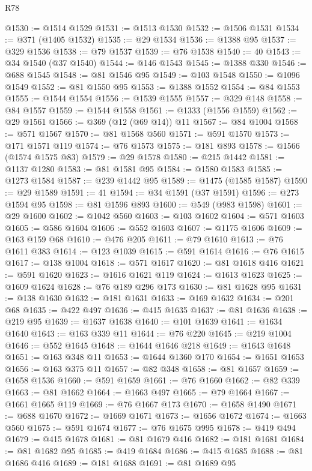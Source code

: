 \begin{lexlean}{R78}
\begin{coremodule}
@1530 := @1514 @1529
@1531 := @1513 @1530
@1532 := @1506 @1531
@1534 := @371 (@1405 @1532)
@1535 := @29 @1534
@1536 := @1388 @95
@1537 := @329 @1536
@1538 := @79 @1537
@1539 := @76 @1538
@1540 := 40
@1543 := @34 @1540 (@37 @1540)
@1544 := @146 @1543
@1545 := @1388 @330
@1546 := @688 @1545
@1548 := @81 @1546 @95
@1549 := @103 @1548
@1550 := @1096 @1549
@1552 := @81 @1550 @95
@1553 := @1388 @1552
@1554 := @84 @1553
@1555 := @1544 @1554
@1556 := @1539 @1555
@1557 := @329 @148
@1558 := @84 @1557
@1559 := @1544 @1558
@1561 := @1333 (@1556 @1559)
@1562 := @29 @1561
@1566 := @369 (@12 (@69 @14)) @11
@1567 := @84 @1004
@1568 := @571 @1567
@1570 := @81 @1568 @560
@1571 := @591 @1570
@1573 := @171 @1571 @119
@1574 := @76 @1573
@1575 := @181 @893
@1578 := @1566 (@1574 @1575 @83)
@1579 := @29 @1578
@1580 := @215 @1442
@1581 := @1137 @1280
@1583 := @81 @1581 @95
@1584 := @1580 @1583
@1585 := @1273 @1584
@1587 := @239 @1442 @95
@1589 := @1475 (@1585 @1587)
@1590 := @29 @1589
@1591 := 41
@1594 := @34 @1591 (@37 @1591)
@1596 := @273 @1594 @95
@1598 := @81 @1596 @893
@1600 := @549 (@983 @1598)
@1601 := @29 @1600
@1602 := @1042 @560
@1603 := @103 @1602
@1604 := @571 @1603
@1605 := @586 @1604
@1606 := @552 @1603
@1607 := @1175 @1606
@1609 := @163 @159 @68
@1610 := @476 @205
@1611 := @79 @1610
@1613 := @76 @1611 @383
@1614 := @123 @1039
@1615 := @591 @1614
@1616 := @76 @1615
@1617 := @138 @1004
@1618 := @571 @1617
@1620 := @81 @1618 @416
@1621 := @591 @1620
@1623 := @1616 @1621 @119
@1624 := @1613 @1623
@1625 := @1609 @1624
@1628 := @76 @189 @296 @173
@1630 := @81 @1628 @95
@1631 := @138 @1630
@1632 := @181 @1631
@1633 := @169 @1632
@1634 := @201 @68
@1635 := @422 @497
@1636 := @415 @1635
@1637 := @81 @1636
@1638 := @219 @95
@1639 := @1637 @1638
@1640 := @101 @1639
@1641 := @1634 @1640
@1643 := @163 @339 @11
@1644 := @76 @220
@1645 := @219 @1004
@1646 := @552 @1645
@1648 := @1644 @1646 @218
@1649 := @1643 @1648
@1651 := @163 @348 @11
@1653 := @1644 @1360 @170
@1654 := @1651 @1653
@1656 := @163 @375 @11
@1657 := @82 @348
@1658 := @81 @1657
@1659 := @1658 @1536
@1660 := @591 @1659
@1661 := @76 @1660
@1662 := @82 @339
@1663 := @81 @1662
@1664 := @1663 @497
@1665 := @79 @1664
@1667 := @1661 @1665 @119
@1669 := @76 @1667 @173
@1670 := @1658 @1490
@1671 := @688 @1670
@1672 := @1669 @1671
@1673 := @1656 @1672
@1674 := @1663 @560
@1675 := @591 @1674
@1677 := @76 @1675 @995
@1678 := @419 @494
@1679 := @415 @1678
@1681 := @81 @1679 @416
@1682 := @181 @1681
@1684 := @81 @1682 @95
@1685 := @419 @1684
@1686 := @415 @1685
@1688 := @81 @1686 @416
@1689 := @181 @1688
@1691 := @81 @1689 @95

\end{coremodule}
\end{lexlean}
